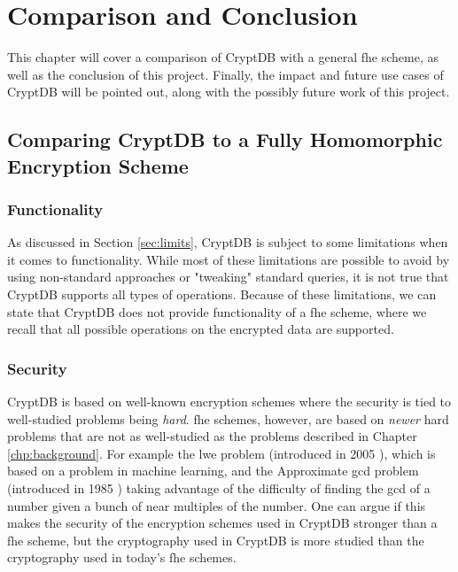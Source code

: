 \chapter{Comparison and Conclusion}
\label{chp:conclusion}

This chapter will cover a comparison of CryptDB with a general \gls{fhe} scheme, as well as the conclusion of this project. Finally, the impact and future use cases of CryptDB will be pointed out, along with the possibly future work of this project.

\section{Comparing CryptDB to a Fully Homomorphic Encryption Scheme}

\subsection{Functionality}
As discussed in Section \ref{sec:limits}, CryptDB is subject to some limitations when it comes to functionality. While most of these limitations are possible to avoid by using non-standard approaches or "tweaking" standard queries, it is not true that CryptDB supports all types of operations. Because of these limitations, we can state that CryptDB does not provide functionality of a \gls{fhe} scheme, where we recall that all possible operations on the encrypted data are supported.

\subsection{Security}

CryptDB is based on well-known encryption schemes where the security is tied to well-studied problems being \emph{hard}. \gls{fhe} schemes, however, are based on \emph{newer} hard problems that are not as well-studied as the problems described in Chapter \ref{chp:background}. For example the \gls{lwe} problem (introduced in 2005 \cite{lwe}), which is based on a problem in machine learning, and the Approximate \gls{gcd} problem (introduced in 1985 \cite{app_gcd}) taking advantage of the difficulty of finding the \gls{gcd} of a number given a bunch of near multiples of the number. One can argue if this makes the security of the encryption schemes used in CryptDB stronger than a \gls{fhe} scheme, but the cryptography used in CryptDB is more studied than the cryptography used in today's \gls{fhe} schemes.

